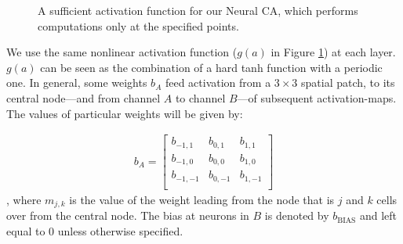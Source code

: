 \documentclass{article}
\begin{document}
\begin{figure}

\caption{A sufficient activation function for our Neural CA, which performs computations only at the specified points.}
\label{fig:activation}
\end{figure}

We use the same nonlinear activation function ($g(a)$ in Figure \ref{fig:activation}) at each layer. 
$g(a)$ can be seen as the combination of a hard tanh function with a periodic one.
In general, some weights $b_{A}$ feed activation from a $3\times 3$ spatial patch, to its central node---and from channel $A$ to channel $B$---of subsequent activation-maps. The values of particular weights will be given by: 

\begin{align*}
	b_{A} = \begin{bmatrix}
		b_{-1, 1} & b_{0, 1} & b_{1, 1} \\
		b_{-1, 0} & b_{0, 0} & b_{1, 0} \\
		b_{-1, -1} & b_{0, -1} & b_{1, -1}\\
	\end{bmatrix}
\end{align*}
, 	where $m_{j, k}$ is the value of the weight leading from the node that is $j$ and $k$ cells over from the central node. The bias at neurons in $B$ is denoted by $b_\text{BIAS}$ and left equal to $0$ unless otherwise specified.
\end{document}

